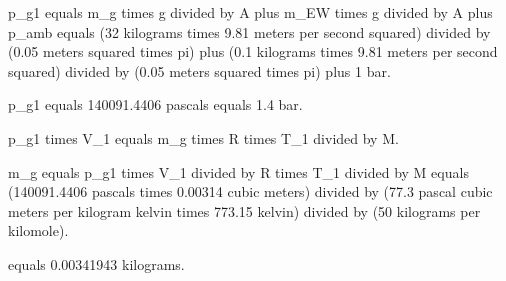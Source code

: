 p_g1 equals m_g times g divided by A plus m_EW times g divided by A plus p_amb equals (32 kilograms times 9.81 meters per second squared) divided by (0.05 meters squared times pi) plus (0.1 kilograms times 9.81 meters per second squared) divided by (0.05 meters squared times pi) plus 1 bar.  

p_g1 equals 140091.4406 pascals equals 1.4 bar.  

p_g1 times V_1 equals m_g times R times T_1 divided by M.  

m_g equals p_g1 times V_1 divided by R times T_1 divided by M equals (140091.4406 pascals times 0.00314 cubic meters) divided by (77.3 pascal cubic meters per kilogram kelvin times 773.15 kelvin) divided by (50 kilograms per kilomole).  

equals 0.00341943 kilograms.